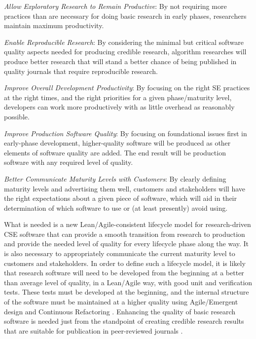 \documentclass[11pt]{SANDreport}
\begin{document}
\begin{compactitem}

{}\item\textit{Allow Exploratory Research to Remain Productive}: By not requiring more practices than are necessary for doing basic research in early phases, researchers maintain maximum productivity.

{}\item\textit{Enable Reproducible Research}: By considering the minimal but critical software quality aspects needed for producing credible research, algorithm researches will produce better research that will stand a better chance of being published in quality journals that require reproducible research.

{}\item\textit{Improve Overall Development Productivity}: By focusing on the right SE practices at the right times, and the right priorities for a given phase/maturity level, developers can work more productively with as little overhead as reasonably possible.

{}\item\textit{Improve Production Software Quality}: By focusing on foundational issues first in early-phase development, higher-quality software will be produced as other elements of software quality are added.  The end result will be production software with any required level of quality.

{}\item\textit{Better Communicate Maturity Levels with Customers}: By clearly defining maturity levels and advertising them well, customers and stakeholders will have the right expectations about a given piece of software, which will  aid in their determination of which software to use or (at least presently) avoid using.

\end{compactitem}

What is needed is a new Lean/Agile-consistent lifecycle model for research-driven CSE software that can provide a smooth transition from research to production and provide the needed level of quality for every lifecycle phase along the way.  It is also necessary to appropriately communicate the current maturity level to customers and stakeholders.  In order to define such a lifecycle model, it is likely that research software will need to be developed from the beginning at a better than average level of quality, in a Lean/Agile way, with good unit and verification tests.  These tests must be developed at the beginning, and the internal structure of the software must be maintained at a higher quality using Agile/Emergent design and Continuous Refactoring {}\cite{ref:emergent_design_08}.  Enhancing the quality of basic research software is needed just from the standpoint of creating credible research results that are suitable for publication in peer-reviewed journals {}\cite{CompSciDemandsNewParadigm05, ScientistsNightmareFiveRetractions2006}.
\end{document}
